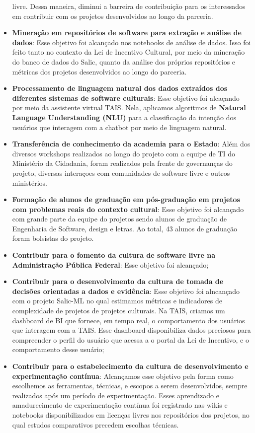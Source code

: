 \begin{itemize}
  livre. Dessa maneira, diminui a barreira de contribuição para os
  interessados em contribuir com os projetos desenvolvidos ao longo da
  parceria.
\item
  \textbf{Mineração em repositórios de software para extração e análise
  de dados}: Esse objetivo foi alcançado nos notebooks de análise de
  dados. Isso foi feito tanto no contexto da Lei de Incentivo Cultural,
  por meio da mineração do banco de dados do Salic, quanto da análise
  dos próprios repositórios e métricas dos projetos desenvolvidos ao
  longo do parceria.
\item
  \textbf{Processamento de linguagem natural dos dados extraídos dos
  diferentes sistemas de software culturais}: Esse objetivo foi
  alcaçando por meio da assistente virtual TAIS. Nela, aplicamos
  algoritmos de \textbf{Natural Language Understanding (NLU)} para a
  classificação da intenção dos usuários que interagem com a chatbot por
  meio de linguagem natural.
\item
  \textbf{Transferência de conhecimento da academia para o Estado}: Além
  dos diversos workshops realizados ao longo do projeto com a equipe de
  TI do Ministério da Cidadania, foram realizados pela frente de
  governanças do projeto, diversas interaçoes com comunidades de
  software livre e outros ministérios.
\item
  \textbf{Formação de alunos de graduação em pós-graduação em projetos
  com problemas reais do contexto cultural}: Esse objetivo foi alcançado
  com grande parte da equipe do projetos sendo alunos de graduação de
  Engenharia de Software, design e letras. Ao total, 43 alunos de
  graduação foram bolsistas do projeto.
\item
  \textbf{Contribuir para o fomento da cultura de software livre na
  Administração Pública Federal}: Esse objetivo foi alcançado;
\item
  \textbf{Contribuir para o desenvolvimento da cultura de tomada de
  decisões orientadas a dados e evidência}: Esse objetivo foi alncançado
  com o projeto Salic-ML no qual estimamos métricas e indicadores de
  complexidade de projetos de projetos culturais. Na TAIS, criamos um
  dashboard de BI que fornece, em tempo real, o comportamento dos
  usuários que interagem com a TAIS. Esse dashboard disponibiliza dados
  preciosos para compreender o perfil do usuário que acessa a o portal
  da Lei de Incentivo, e o comportamento desse usuário;
\item
  \textbf{Contribuir para o estabelecimento da cultura de
  desenvolvimento e experimentação contínua}: Alcançamos esse objetivo
  pela forma como escolhemos as ferramentas, técnicas, e escopos a serem
  desenvolvidos, sempre realizados após um período de experimentação.
  Esses aprendizado e amadurecimento de experimentação contínua foi
  registrado nas wikis e notebooks disponibilizados em licenças livres
  nos repositórios dos projetos, no qual estudos comparativos precedem
  escolhas técnicas.
\end{itemize}

